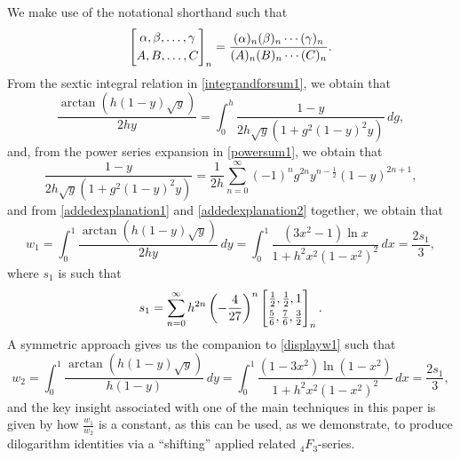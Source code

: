 \documentclass[12pt]{article}
\begin{document}
 We make use of the notational shorthand such that 
\begin{equation*}
 \left[ \begin{matrix} \alpha, \beta, \ldots, \gamma \vspace{1mm} \\ 
 A, B, \ldots, C \end{matrix} \right]_{n} = \frac{ (\alpha)_{n} (\beta)_{n} 
 \cdots (\gamma)_{n} }{ (A)_{n} (B)_{n} \cdots (C)_{n}}. 
\end{equation*}
 From the sextic integral relation in \eqref{integrandforsum1}, we obtain that 
\begin{equation}\label{addedexplanation1}
 \frac{ \operatorname{arctan}\left( h (1 - y) \sqrt{y} \right) }{2 h y} = \int_{0}^{h} 
 \frac{1-y}{2 h \sqrt{y} \left(1 + g^2 (1-y)^2 y \right)} \, dg, 
\end{equation}
 and, from the power series expansion in \eqref{powersum1}, we obtain that 
\begin{equation}\label{addedexplanation2}
 \frac{1-y}{2 h \sqrt{y} \left(1 + g^2 (1-y)^2 y \right)} 
 = \frac{1}{2h } \sum_{n=0}^{\infty} (-1)^{n} g^{2n} y^{n - \frac{1}{2}} (1-y)^{2n+1}, 
\end{equation}
 and from \eqref{addedexplanation1} and \eqref{addedexplanation2} together, we obtain that 
\begin{equation}\label{displayw1}
 w_1 = \int_0^1 \frac{\arctan\left(h (1 - y) \sqrt{y}\right)}{ 2 h y} \, dy = 
 \int_{0}^{1} \frac{ (3x^2 - 1) \ln x }{1 + h^2 x^2 (1-x^2)^2} \, dx
 = \frac{ 2 s_1}{3}, 
\end{equation}
 where $s_1$ is such that 
\begin{equation}\label{displays1}
 s_1 = \sum_{n=0}^{\infty} 
 h^{2n} \left( -\frac{4}{27} \right)^{n} 
 \left[ \begin{matrix} \frac{1}{2}, \frac{1}{2}, 1 
 \vspace{1mm} \\ 
 \frac{5}{6}, \frac{7}{6}, \frac{3}{2} \end{matrix} \right]_{n}. 
\end{equation}
 A symmetric approach gives us the companion to \eqref{displayw1} such that 
\begin{equation}\label{displayw2}
 w_2 = \int_0^1 \frac{\arctan\left(h (1 - y) \sqrt{y}\right)}{h(1 - y)} \, dy 
 = \int_{0}^{1} \frac{ (1-3x^2) \ln(1-x^2) }{1 + h^2 x^2 (1-x^2)^2} \, dx = \frac{ 2 s_1}{3}, 
\end{equation}
 and the key insight associated with one of the main techniques in this paper is given by how $\frac{w_1}{w_2}$ is a constant, as this can 
 be used, as we demonstrate, to produce dilogarithm identities via a ``shifting'' applied related ${}_{4}F_{3}$-series. 
\end{document}
